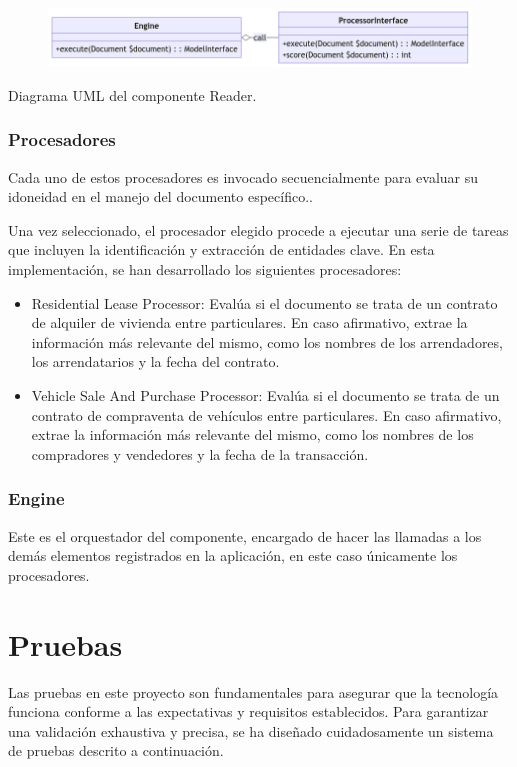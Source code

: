 \begin{figure}
    \centering
    \includegraphics{./chapter/4/images/ad_4nxcg3r2qv9xc3mw0lynfkpfwfmxpbrpvfhfpr7-3idtd0eopjq9nsbhnvqcgq5hz9hwcy4jam9vqvffwys6jvo_a20paqxml}
    \caption{}
    \label{fig:ad_4nxcg3r2qv9xc3mw0lynfkpfwfmxpbrpvfhfpr7-3idtd0eopjq9nsbhnvqcgq5hz9hwcy4jam9vqvffwys6jvo_a20paqxml}
\end{figure}

Diagrama UML del componente Reader.

\subsubsection*{Procesadores}
Cada uno de estos procesadores es invocado secuencialmente para evaluar su idoneidad en el manejo del documento específico..

Una vez seleccionado, el procesador elegido procede a ejecutar una serie de tareas que incluyen la identificación y extracción de entidades clave. En esta implementación, se han desarrollado los siguientes procesadores:

\begin{itemize}
    \item Residential Lease Processor: Evalúa si el documento se trata de un contrato de alquiler de vivienda entre particulares. En caso afirmativo, extrae la información más relevante del mismo, como los nombres de los arrendadores, los arrendatarios y la fecha del contrato.
    \item Vehicle Sale And Purchase Processor: Evalúa si el documento se trata de un contrato de compraventa de vehículos entre particulares. En caso afirmativo, extrae la información más relevante del mismo, como los nombres de los compradores y vendedores y la fecha de la transacción.
\end{itemize}

\subsubsection*{Engine}
Este es el orquestador del componente, encargado de hacer las llamadas a los demás elementos registrados en la aplicación, en este caso únicamente los procesadores.

\section*{Pruebas}
Las pruebas en este proyecto son fundamentales para asegurar que la tecnología funciona conforme a las expectativas y requisitos establecidos. Para garantizar una validación exhaustiva y precisa, se ha diseñado cuidadosamente un sistema de pruebas descrito a continuación.

